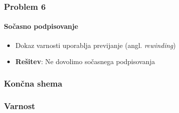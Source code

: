\documentclass{beamer}    %
\begin{document}
\begin{frame}
    \frametitle{Problem 6}
    \framesubtitle{Sočasno podpisovanje}
    \begin{itemize}
        \item Dokaz varnosti uporablja previjanje (angl. \textit{rewinding})
        \vspace{1cm}
        \item \textbf{Rešitev}: Ne dovolimo sočasnega podpisovanja
    \end{itemize}
\end{frame}

\begin{frame}
    \frametitle{Končna shema}
\end{frame}

\begin{frame}
    \frametitle{Varnost}
\end{frame}
\end{document}
